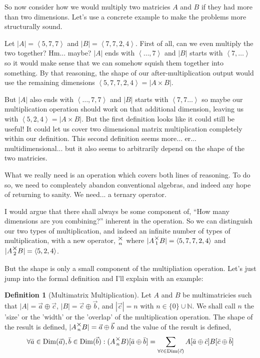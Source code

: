 \documentclass[12pt]{book}
\theoremstyle{plain}
\theoremstyle{definition}
\newtheorem{definition}{Definition}[chapter]
\theoremstyle{ppart}
\theoremstyle{case}
\theoremstyle{solution}
\DeclareMathOperator{\Dim}{Dim}
\newcommand{\mmult}[1]{\text{\raisebox{1ex}{$\underset{#1}{\times}$}}}
\begin{document}
So now consider how we would multiply two matricies $A$ and $B$ if they had more
than two dimensions. Let's use a concrete example to make the problems more
structurally sound.

Let $|A| = \left<5,7,7\right>$ and $|B| = \left<7,7,2,4\right>$.
First of all, can we even multiply the two together? Hm... maybe? $|A|$ ends with
$\left<\ldots, 7\right>$ and $|B|$ starts with $\left<7,\ldots\right>$ so it would
make sense that we can somehow squish them together into something. By that reasoning,
the shape of our after-multiplication output would use the remaining dimensions
$\left<5, 7, 7, 2, 4\right> = |A \times B|$.

But $|A|$ also ends with $\left<\ldots, 7, 7\right>$ and $|B|$ starts with
$\left<7, 7\ldots\right>$ so maybe our multiplication operation should work on that
additional dimension, leaving us with $\left<5, 2, 4\right> = |A \times B|$.
But the first definition looks like it could still be useful! It could let us cover 
two dimensional matrix multiplication completely within our definition. This second
definition seems more... er... multidimensional... but it also seems to
arbitrarily depend on the shape of the two matricies.

What we really need is an operation which covers both lines of reasoning. To do
so, we need to compleately abandon conventional algebras, and indeed any hope of
returning to sanity. We need... a ternary operator.

I would argue that there shall always be some component of, 
``How many dimensions are you combining?'' inherent
in the operation. So we can distinguish our two types of multiplication, and indeed
an infinite number of types of multiplication, with a new operator, $\mmult{n}$ where
$|A \mmult{1} B| = \left<5, 7, 7, 2, 4\right>$ and 
$|A \mmult{2} B| = \left<5, 2, 4\right>$.

But the shape is only a small component of the multipliation  operation. Let's
just jump into the formal definition and I'll explain with an example:

\begin{definition}[Multimatrix Multiplication]
\label{mm_mult}
Let $A$ and $B$ be multimatricies such that $|A| = \vec{a} \oplus \vec{c}$,
$|B| = \vec{c} \oplus \vec{b}$, and $|\vec{c}| = n$ with
$n \in \{0\} \cup \mathbb{N}$. We shall call $n$ the 'size' or the 'width'
or the 'overlap' of the multiplication operation.
The shape of the result is defined, $|A \mmult{n} B| = \vec{a} \oplus \vec{b}$
and the value of the result is defined,
\[
\forall \bar{a} \in \Dim(\vec{a}), \bar{b} \in \Dim(\vec{b}):
(A \mmult{n}  B)[\bar{a} \oplus \bar{b}] =
\sum_{\forall \bar{c} \in \Dim(\vec{c})}
  A[\bar{a} \oplus \bar{c}] B[\bar{c} \oplus \bar{b}]
\]
\end{definition}
\end{document}
